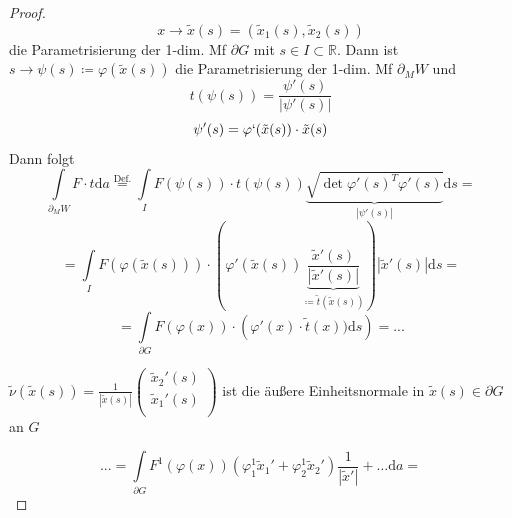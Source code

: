 \begin{proof}
\begin{equation*}
x \rightarrow \tilde{x}(s) = (\tilde{x}_1 (s), \tilde{x}_2 (s))
\end{equation*}
die Parametrisierung der 1-dim. Mf $\partial G $ mit
$s \in I \subset \mathbb{R}$. Dann ist $s \rightarrow \psi(s) \coloneqq \varphi(\tilde{x}(s)) $ die Parametrisierung der 1-dim. Mf $\partial_M W $
und \\
\begin{equation*}
	t(\psi(s)) = \frac{\psi'(s)}{|\psi'(s)|}
\end{equation*}
\begin{equation*}
\psi'(s) = \varphi`(\tilde{x}(s)) \cdot \tilde{x}(s)
\end{equation*}
Dann folgt
\begin{equation*}
    \int\limits_{\partial_M W} F \cdot t \mathrm{d}a
\stackrel{\text{Def.}}{=}
    \int\limits_I F(\psi(s)) \cdot t(\psi(s))
    \underbrace{
        \sqrt{\det \varphi'(s)^T \varphi'(s)}
        }_{
        |\psi'(s)|
        }
    \mathrm{d}s
=
\end{equation*}
\begin{equation*}
    = \int\limits_I F(\varphi(\tilde{x}(s))) \cdot
    \left(
        \varphi'(\tilde{x}(s)) 
        \underbrace{
            \frac{
                \tilde{x}'(s)
                }{
                |\tilde{x}'(s)|
                }
            }_{
            \coloneqq \tilde{t}(\tilde{x}(s))
            }
    \right)
    |\tilde{x}'(s)| \mathrm{d}s = 
\end{equation*}
\begin{equation*}
=
    \int\limits_{\partial G} F (\varphi(x)) \cdot
    \left(
        \varphi'(x) \cdot \tilde{t}(x)) \mathrm{d}s
    \right) = ...
\end{equation*}

\hspace{30pt}
    $
    \tilde{\nu}(\tilde{x}(s))
    =
    \frac{1}{
    | \tilde{x}(s) |}
    \begin{pmatrix}
        \tilde{x}_2'(s) \\
        \tilde{x}_1'(s) \\
    \end{pmatrix}
    $
    ist die äußere Einheitsnormale in $\tilde{x}(s) \in \partial G $ an $G$

\begin{equation*}
...=
    \int\limits_{\partial G} F^1(\varphi(x))
    \left(
        \varphi_1^1 \tilde{x}_1' + \varphi_2^1 \tilde{x}_2'
    \right)
    \frac{1}{| \tilde{x}' |}
    + \ldots \mathrm{d}a = 
\end{equation*}


\end{proof}
